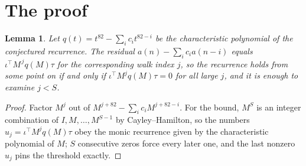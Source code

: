 \documentclass[11pt,a4paper]{article}
\theoremstyle{plain}
\newtheorem{lemma}[theorem]{Lemma}
\theoremstyle{definition}
\begin{document}
\section{The proof}

\begin{lemma}\label{lem:crit}
Let $q(t)=t^{82}-\sum_i c_it^{82-i}$ be the characteristic polynomial of the
conjectured recurrence. The residual $a(n)-\sum_ic_ia(n-i)$ equals
$\iota^{\!\top}M^{\,j}q(M)\tau$ for the corresponding walk index $j$, so the recurrence
holds from some point on if and only if $\iota^{\!\top}M^{j}q(M)\tau=0$ for all large $j$,
and it is enough to examine $j<S$.
\end{lemma}

\begin{proof}
Factor $M^{j}$ out of $M^{j+82}-\sum_ic_iM^{j+82-i}$. For the bound, $M^{S}$
is an integer combination of $I,M,\dots,M^{S-1}$ by Cayley--Hamilton, so the numbers
$u_j=\iota^{\!\top}M^{j}q(M)\tau$ obey the monic recurrence given by the characteristic
polynomial of $M$; $S$ consecutive zeros force every later one, and the last nonzero $u_j$
pins the threshold exactly.
\end{proof}
\end{document}
